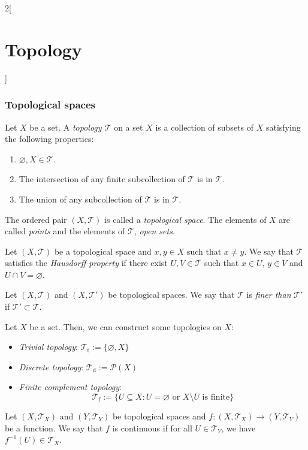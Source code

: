 \documentclass[../../../main.tex]{subfiles}
\begin{document}
\begin{multicols}{2}[\section{Topology}]
  \subsubsection*{Topological spaces}
  \begin{definition}
    Let $X$ be a set. A \textit{topology $\mathcal{T}$} on a set $X$ is a collection of subsets of $X$ satisfying the following properties:
    \begin{enumerate}
      \item $\varnothing, X\in\mathcal{T}$.
      \item The intersection of any finite subcollection of $\mathcal{T}$ is in $\mathcal{T}$.
      \item The union of any subcollection of $\mathcal{T}$ is in $\mathcal{T}$.
    \end{enumerate}
    The ordered pair $(X,\mathcal{T})$ is called a \textit{topological space}. The elements of $X$ are called \textit{points} and the elements of $\mathcal{T}$, \textit{open sets}.
  \end{definition}
  \begin{definition}
    Let $(X,\mathcal{T})$ be a topological space and $x,y\in X$ such that $x\ne y$. We say that $\mathcal{T}$ satisfies the \textit{Hausdorff property} if there exist $U,V\in\mathcal{T}$ such that $x\in U$, $y\in V$ and $U\cap V=\varnothing$.
  \end{definition}
  \begin{definition}
    Let $(X,\mathcal{T})$ and $(X,\mathcal{T}')$ be topological spaces. We say that $\mathcal{T}$ is \textit{finer than} $\mathcal{T}'$ if $\mathcal{T}'\subset\mathcal{T}$.
  \end{definition}
  \begin{prop}
    Let $X$ be a set. Then, we can construct some topologies on $X$:
    \begin{itemize}
      \item \textit{Trivial topology}: $\mathcal{T}_\text{t}:=\{\varnothing,X\}$
      \item \textit{Discrete topology}: $\mathcal{T}_\text{d}:=\mathcal{P}(X)$
      \item \textit{Finite complement topology}: $$\mathcal{T}_\text{f}:=\{U\subseteq X:U=\varnothing\text{ or }X\setminus U\text{ is finite}\}$$
    \end{itemize}
  \end{prop}
  \begin{definition}
    Let $(X,\mathcal{T}_X)$ and $(Y,\mathcal{T}_Y)$ be topological spaces and $f:(X,\mathcal{T}_X)\rightarrow(Y,\mathcal{T}_Y)$ be a function. We say that $f$ is continuous if for all $U\in\mathcal{T}_Y$, we have $f^{-1}(U)\in\mathcal{T}_X$.

\end{definition}
\end{multicols}
\end{document}
